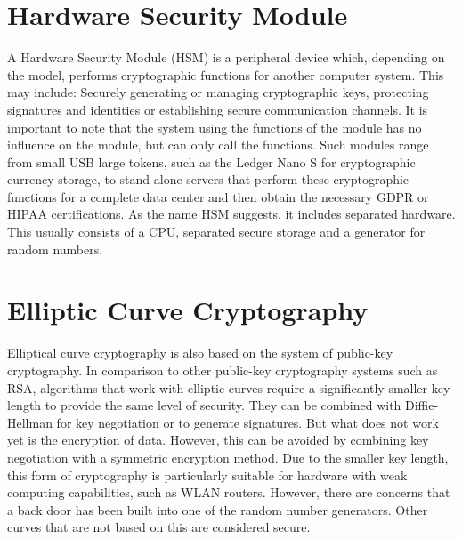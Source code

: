 \documentclass[12pt,oneside,a4paper,parskip]{scrbook}
\begin{document}
\section{Hardware Security Module}
\label{sec:HSM}

A Hardware Security Module (HSM) is a peripheral device which, depending on the model, performs cryptographic functions for another computer system. This may include: Securely generating or managing cryptographic keys, protecting signatures and identities or establishing secure communication channels. It is important to note that the system using the functions of the module has no influence on the module, but can only call the functions. Such modules range from small USB large tokens, such as the Ledger Nano S for cryptographic currency storage, to stand-alone servers that perform these cryptographic functions for a complete data center and then obtain the necessary GDPR or HIPAA certifications. As the name HSM suggests, it includes separated hardware. This usually consists of a CPU, separated secure storage and a generator for random numbers.
\parencite{ibm_hardware_2020} \parencite{gemalto_safenet_2020} \parencite{sustek_hardware_2011}

\section{Elliptic Curve Cryptography}

Elliptical curve cryptography is also based on the system of public-key cryptography. In comparison to other public-key cryptography systems such as RSA, algorithms that work with elliptic curves require a significantly smaller key length to provide the same level of security. They can be combined with Diffie-Hellman for key negotiation or to generate signatures. But what does not work yet is the encryption of data. However, this can be avoided by combining key negotiation with a symmetric encryption method. Due to the smaller key length, this form of cryptography is particularly suitable for hardware with weak computing capabilities, such as WLAN routers. However, there are concerns that a back door has been built into one of the random number generators. Other curves that are not based on this are considered secure. 
\parencite{hankerson_elliptic_2011} \parencite{schneier_essays_2007} \parencite{wifi_security_2020}




\end{document}
